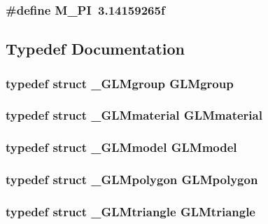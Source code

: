 \subsubsection[{M\-\_\-\-P\-I}]{\setlength{\rightskip}{0pt plus 5cm}\#define M\-\_\-\-P\-I~3.\-14159265f}\label{glm_8h_ae71449b1cc6e6250b91f539153a7a0d3}


\subsection{Typedef Documentation}
\subsubsection[{G\-L\-Mgroup}]{\setlength{\rightskip}{0pt plus 5cm}typedef struct {\bf \-\_\-\-G\-L\-Mgroup}  {\bf G\-L\-Mgroup}}\label{glm_8h_a3348ee75e7c9d852832871d34c92d4c2}
\subsubsection[{G\-L\-Mmaterial}]{\setlength{\rightskip}{0pt plus 5cm}typedef struct {\bf \-\_\-\-G\-L\-Mmaterial}  {\bf G\-L\-Mmaterial}}\label{glm_8h_a857df9d11549666c7c34b1ef2fe176f6}
\subsubsection[{G\-L\-Mmodel}]{\setlength{\rightskip}{0pt plus 5cm}typedef struct {\bf \-\_\-\-G\-L\-Mmodel}  {\bf G\-L\-Mmodel}}\label{glm_8h_a3d2fd596a00bc5964e431b6596f61b19}
\subsubsection[{G\-L\-Mpolygon}]{\setlength{\rightskip}{0pt plus 5cm}typedef struct {\bf \-\_\-\-G\-L\-Mpolygon}  {\bf G\-L\-Mpolygon}}\label{glm_8h_a9a253c1091195ce8a75b1714d47caf90}
\subsubsection[{G\-L\-Mtriangle}]{\setlength{\rightskip}{0pt plus 5cm}typedef struct {\bf \-\_\-\-G\-L\-Mtriangle}  {\bf G\-L\-Mtriangle}}\label{glm_8h_aba6ddcc872352f616ca7fe9148fb1b54}


